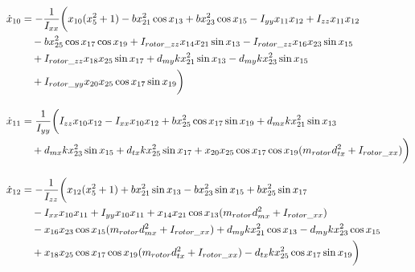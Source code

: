 \begin{align}
\dot{x}_{10} &= -\frac{1}{I_{xx}} \bigg( x_{10}(x_5^2 + 1) - b x_{21}^2 \cos x_{13} + b x_{23}^2 \cos x_{15} - I_{yy} x_{11} x_{12} + I_{zz} x_{11} x_{12} \notag \\
&\quad - b x_{25}^2 \cos x_{17} \cos x_{19} + I_{rotor\_zz} x_{14} x_{21} \sin x_{13} - I_{rotor\_zz} x_{16} x_{23} \sin x_{15} \notag \\
&\quad + I_{rotor\_zz} x_{18} x_{25} \sin x_{17} + d_{my} k x_{21}^2 \sin x_{13} - d_{my} k x_{23}^2 \sin x_{15} \notag \\
&\quad + I_{rotor\_yy} x_{20} x_{25} \cos x_{17} \sin x_{19} \bigg) \\[1em]
\dot{x}_{11} &= \frac{1}{I_{yy}} \bigg( I_{zz} x_{10} x_{12} - I_{xx} x_{10} x_{12} + b x_{25}^2 \cos x_{17} \sin x_{19} + d_{mx} k x_{21}^2 \sin x_{13} \notag \\
&\quad + d_{mx} k x_{23}^2 \sin x_{15} + d_{tx} k x_{25}^2 \sin x_{17} + x_{20} x_{25} \cos x_{17} \cos x_{19}(m_{rotor} d_{tx}^2 + I_{rotor\_xx}) \bigg) \\[1em]
\dot{x}_{12} &= -\frac{1}{I_{zz}} \bigg( x_{12}(x_5^2 + 1) + b x_{21}^2 \sin x_{13} - b x_{23}^2 \sin x_{15} + b x_{25}^2 \sin x_{17} \notag \\
&\quad - I_{xx} x_{10} x_{11} + I_{yy} x_{10} x_{11} + x_{14} x_{21} \cos x_{13}(m_{rotor} d_{mx}^2 + I_{rotor\_xx}) \notag \\
&\quad - x_{16} x_{23} \cos x_{15}(m_{rotor} d_{mx}^2 + I_{rotor\_xx}) + d_{my} k x_{21}^2 \cos x_{13} - d_{my} k x_{23}^2 \cos x_{15} \notag \\
&\quad + x_{18} x_{25} \cos x_{17} \cos x_{19}(m_{rotor} d_{tx}^2 + I_{rotor\_xx}) - d_{tx} k x_{25}^2 \cos x_{17} \sin x_{19} \bigg)
\end{align}